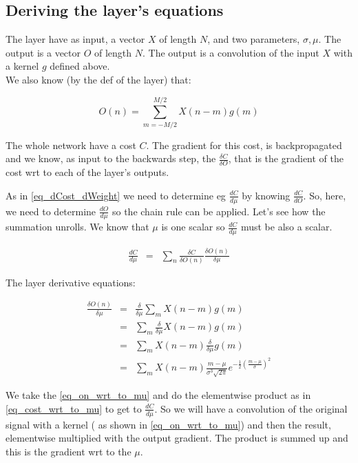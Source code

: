 \documentclass{article}
\begin{document}
\subsection{Deriving the layer's equations}

The layer have as input, a vector $X$ of length	$N$, and two parameters, $\sigma, \mu$. The output is a vector $O$ of length $N$. The output is a convolution of the input $X$ with a kernel $g$ defined above.\\

We also know (by the def of the layer) that:

\begin{equation}
	O(n) = \sum_{m=-M/2}^{M/2} X(n-m)g(m)
\end{equation}


The whole network have a cost $C$. The gradient for this cost, is backpropagated and we know, as input to the backwards step, the $\frac{\delta C}{\delta O}$, that is the gradient of the cost wrt to each of the layer's outputs. 

As in \eqref{eq_dCost_dWeight} we need to determine eg $\frac{dC}{d\mu}$ by knowing $\frac{dC}{dO}$. So, here, we need to determine $\frac{dO}{d\mu}$ so the chain rule can be applied. Let's see how the summation unrolls. We know that $\mu$ is one scalar so $\frac{dC}{d\mu}$ must be also a scalar.

\begin{eqnarray}
	\label{eq_cost_wrt_to_mu}
	\frac{dC}{d\mu}&=&\sum_n \frac{\delta C}{\delta O(n)} \frac{\delta O(n)}{\delta \mu} 
\end{eqnarray}

The layer derivative equations:

\begin{eqnarray}
	\frac{\delta O(n)}{\delta\mu}&=& \frac{\delta}{\delta \mu} \sum_m X(n-m)g(m)\\
	&=&\sum_m \frac{\delta}{\delta \mu} X(n-m)g(m) \\
	&=&\sum_m X(n-m) \frac{\delta}{\delta \mu} g(m) \\
	\label{eq_on_wrt_to_mu}
	&=&\sum_m X(n-m) \frac{m - \mu}{\sigma ^3 \sqrt{2 \pi}} e^{-\frac{1}{2} \left(\frac{m - \mu}{\sigma}\right)^2}
\end{eqnarray}

We take the \eqref{eq_on_wrt_to_mu} and do the elementwise product as in \eqref{eq_cost_wrt_to_mu} to get to $\frac{dC}{d\mu}$. So we will have a convolution of the original signal with a kernel ( as shown in \eqref{eq_on_wrt_to_mu}) and then the result, elementwise multiplied with the output gradient. The product is summed up and this is the gradient wrt to the $\mu$.\\
\end{document}
